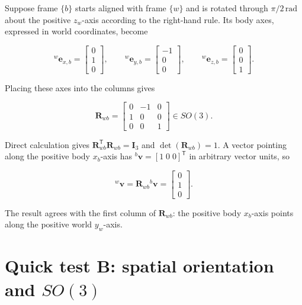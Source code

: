 \documentclass[
  australian,
  12pt,
  letterpaper,
  DIV=11,
  numbers=noendperiod,
  twoside]{scrreprt}
\begin{document}
Suppose frame \(\{b\}\) starts aligned with frame \(\{w\}\) and is
rotated through \(\pi/2\,\mathrm{rad}\) about the positive \(z_w\)-axis
according to the right-hand rule. Its body axes, expressed in world
coordinates, become

\[
{}^{w}\mathbf e_{x,b}
=
\begin{bmatrix}
0\\1\\0
\end{bmatrix},
\qquad
{}^{w}\mathbf e_{y,b}
=
\begin{bmatrix}
-1\\0\\0
\end{bmatrix},
\qquad
{}^{w}\mathbf e_{z,b}
=
\begin{bmatrix}
0\\0\\1
\end{bmatrix}.
\]

Placing these axes into the columns gives

\[
\boxed{
\mathbf R_{wb}
=
\begin{bmatrix}
0&-1&0\\
1&0&0\\
0&0&1
\end{bmatrix}
\in SO(3)
}.
\]

Direct calculation gives
\(\mathbf R_{wb}^\mathsf T\mathbf R_{wb}=\mathbf I_3\) and
\(\det(\mathbf R_{wb})=1\). A vector pointing along the positive body
\(x_b\)-axis has \({}^{b}\mathbf v=[1\;0\;0]^\mathsf T\) in arbitrary
vector units, so

\[
{}^{w}\mathbf v
=
\mathbf R_{wb}{}^{b}\mathbf v
=
\begin{bmatrix}
0\\1\\0
\end{bmatrix}.
\]

The result agrees with the first column of \(\mathbf R_{wb}\): the
positive body \(x_b\)-axis points along the positive world \(y_w\)-axis.

\section*{\texorpdfstring{Quick test B: spatial orientation and
\(SO(3)\)}{Quick test B: spatial orientation and SO(3)}}\label{quick-test-b-spatial-orientation-and-so3}

\end{document}
